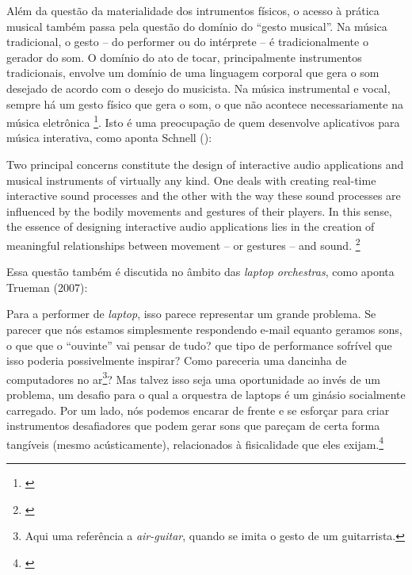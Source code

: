 Além da questão da materialidade dos intrumentos físicos, o acesso à prática musical também passa pela questão do domínio do ``gesto musical''. Na música tradicional, o gesto -- do performer ou do intérprete -- é tradicionalmente o gerador do som. O domínio do ato de tocar, principalmente instrumentos tradicionais, envolve um domínio de uma linguagem corporal que gera o som desejado de acordo com o desejo do musicista. Na música instrumental e vocal, sempre há um gesto físico que gera o som, o que não acontece necessariamente na música eletrônica \footnote{\cite[85]{Smalley1996}}. Isto é uma preocupação de quem desenvolve aplicativos para música interativa, como aponta Schnell (\citeyear{Schnell2013}): 


\begin{citacao}
Two principal concerns constitute the design of interactive audio applications and musical instruments of virtually any kind. One deals with creating real-time interactive sound processes and the other with the way these sound processes are influenced by the bodily movements and gestures of their players. In this sense, the essence of designing interactive audio applications lies in the creation of meaningful relationships between movement – or gestures – and sound. \footnote{\cite{Schnell2013}}
\end{citacao}
Essa questão também é discutida no âmbito das \emph{laptop orchestras}, como aponta Trueman (2007):
\begin{citacao}
Para a performer de \emph{laptop}, isso parece representar um grande problema. Se parecer que nós estamos simplesmente respondendo e-mail equanto geramos sons, o que que o ``ouvinte'' vai pensar de tudo? que tipo de performance sofrível que isso poderia possivelmente inspirar? Como pareceria uma dancinha de computadores no ar\footnote{Aqui uma referência a \emph{air-guitar}, quando se imita o gesto de um guitarrista.}?
Mas talvez isso seja uma oportunidade ao invés de um problema, um desafio para o qual a orquestra de laptops é um ginásio socialmente carregado. Por um lado, nós podemos encarar de frente e se esforçar para criar instrumentos desafiadores que podem gerar sons que pareçam de certa forma tangíveis (mesmo acústicamente), relacionados à fisicalidade que eles exijam.\footnote{\cite[6]{Trueman2007}} 
\end{citacao}

